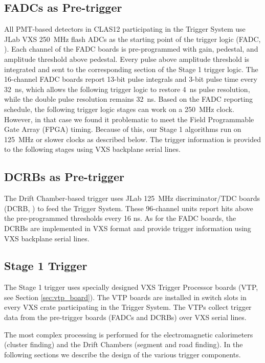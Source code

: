 \subsection{FADCs as Pre-trigger}

All PMT-based detectors in CLAS12 participating in the Trigger System use JLab VXS 250~MHz flash ADCs as the starting point of the trigger logic (FADC, \cite{daq-ref}). Each channel of the FADC boards is pre-programmed with gain, pedestal, and amplitude threshold above pedestal. Every pulse above amplitude threshold is integrated and sent to the corresponding section of the Stage 1 trigger logic. The 16-channel FADC boards report 13-bit pulse integrals and 3-bit pulse time every 32~ns, which allows the following trigger logic to restore 4~ns pulse resolution, while the double pulse resolution remains 32~ns. Based on the FADC reporting schedule, the following trigger logic stages can work on a 250~MHz clock. However, in that case we found it problematic to meet the Field Programmable Gate Array (FPGA) timing. Because of this, our Stage 1 algorithms run on 125~MHz or slower clocks as described below. The trigger information is provided to the following stages using VXS backplane serial lines.


\subsection{DCRBs as Pre-trigger}

The Drift Chamber-based trigger uses JLab 125~MHz discriminator/TDC boards (DCRB, \cite{daq-ref}) to feed the Trigger System. These 96-channel units report hits above the pre-programmed thresholds every 16 ns. As for the FADC boards, the DCRBs are implemented in VXS format and provide trigger information using VXS backplane serial lines.


\subsection{Stage 1 Trigger} 

The Stage 1 trigger uses specially designed VXS Trigger Processor boards (VTP, see Section \ref*{sec:vtp_board}). The VTP boards are installed in switch slots in every VXS crate participating in the Trigger System. The VTPs collect trigger data from the pre-trigger boards (FADCs and DCRBs) over VXS serial lines.

The most complex processing is performed for the electromagnetic calorimeters (cluster finding) and the Drift Chambers (segment and road finding). In the following sections we describe the design of the various trigger components.


